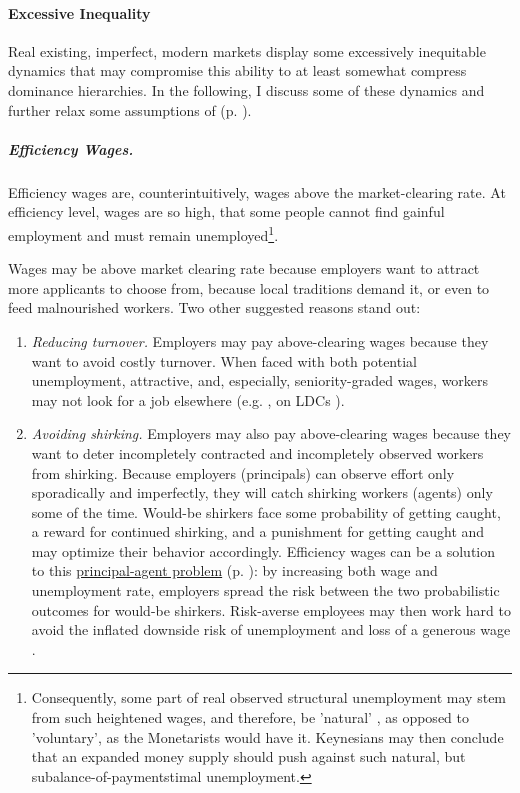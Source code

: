 \paragraph{Excessive Inequality} \label{sec:inequalitydynamics} Real existing, imperfect, modern markets display some excessively inequitable dynamics that may compromise this ability to at least somewhat compress dominance hierarchies. In the following, I discuss some of these dynamics and further relax some assumptions of   (p. \pageref{sec:perfectcompetition}). %

\subparagraph[Efficiency Wages]{Efficiency Wages.}  \label{sec:efficiencywages} Efficiency wages are, counterintuitively, wages above the market-clearing rate. At efficiency level, wages are so high, that some people cannot find gainful employment and must remain unemployed\footnote{
	Consequently, some part of real observed structural unemployment may stem from such heightened wages, and therefore, be 'natural' \citep{Schlicht1978}, as opposed to 'voluntary', as the Monetarists would have it. Keynesians may then conclude that an expanded money supply should push against such natural, but subalance-of-paymentstimal unemployment.}.

Wages may be above market clearing rate because employers want to attract more applicants to choose from, because local traditions demand it, or even to feed malnourished workers. Two other suggested reasons stand out: 

\begin{enumerate}
	\item \emph{Reducing turnover.} Employers may pay above-clearing wages because they want to avoid costly turnover. When faced with both potential unemployment, attractive, and, especially, seniority-graded wages, workers may not look for a job elsewhere (e.g. \citealt{Salop1979}, on \glspl{LDC} \citealt{Stiglitz1974a}).
	\item \emph{Avoiding shirking.} Employers may also pay above-clearing wages because they want to deter incompletely contracted and incompletely observed workers from shirking. Because employers (principals) can observe effort only sporadically and imperfectly, they will catch shirking workers (agents) only some of the time. Would-be shirkers face some probability of getting caught, a reward for continued shirking, and a punishment for getting caught and may optimize their behavior accordingly. Efficiency wages can be a solution to this \hyperref[sec:principal-agentproblem]{principal-agent problem} (p. \pageref{sec:principal-agentproblem}): by increasing both wage and unemployment rate, employers spread the risk between the two probabilistic outcomes for would-be shirkers. Risk-averse employees may then work hard to avoid the inflated downside risk of unemployment and loss of a generous wage \citep{Stiglitz1984}.
\end{enumerate}


